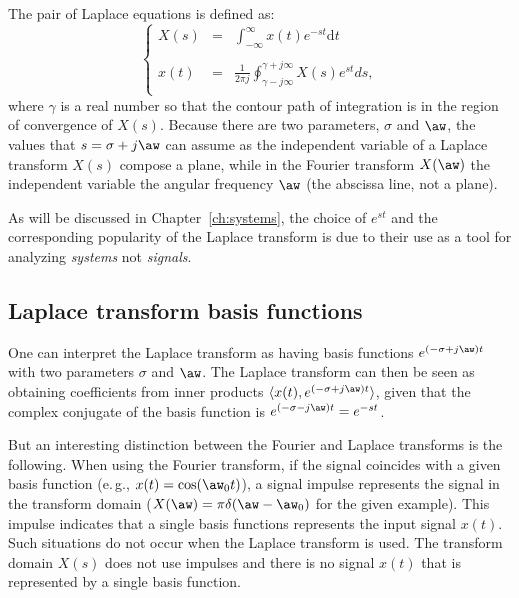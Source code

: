 The pair of Laplace equations is defined as:
\begin{equation}
\left\{
\begin{array}{ccc}
X(s) & = & \int_{-\infty}^\infty x(t) e^{-s t} \textrm{d}t \label{eq:laplace}\\
& & \\
x(t) & = & \frac{1}{2 \pi j} \oint_{\gamma -j \infty}^{\gamma +j \infty} X(s) e^{st} ds,
\\ \end{array}
\right. %
\end{equation}
where $\gamma$ is a real number so that the contour path of integration is in the region of convergence of $X(s)$.
Because there are two parameters, $\sigma$ and $\aw$, the values that $s=\sigma+j \aw$ can assume as the independent variable of a Laplace transform $X(s)$ compose a plane, while in the Fourier transform $X(\aw)$ the independent variable the angular frequency $\aw$ (the abscissa line, not a plane).

As will be discussed in Chapter~\ref{ch:systems}, the choice of $e^{st}$ and the corresponding popularity of the Laplace transform is due to their use as a tool for analyzing \emph{systems} not \emph{signals}. 

\subsection{{\akadvanced} Laplace transform basis functions}

One can interpret the Laplace transform as having basis functions $e^{(-\sigma + j \aw)t}$ with two parameters $\sigma$ and $\aw$.
The Laplace transform can then be seen as obtaining coefficients from inner products $\langle x(t), e^{(-\sigma + j \aw)t}\rangle$, given that the complex conjugate of the basis function is $e^{(-\sigma - j \aw)t} = e^{-st}$.

But an interesting distinction between the Fourier and Laplace transforms is the following. When using the Fourier transform, if the signal coincides with a given basis function (e.\,g., $x(t)=\cos(\aw_0 t)$), a signal impulse represents the signal in the transform domain ($X(\aw) = \pi \delta(\aw - \aw_0)$ for the given example). This impulse indicates that a single basis functions represents the input signal $x(t)$. Such situations do not occur when the Laplace transform is used. The transform domain $X(s)$ does not use impulses and there is no signal $x(t)$ that is represented by a single basis function.

